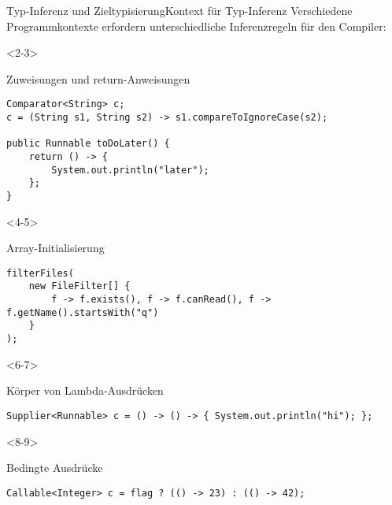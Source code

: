 \begin{frame}[fragile]{Typ-Inferenz und Zieltypisierung}{Kontext für Typ-Inferenz}
    Verschiedene Programmkontexte erfordern unterschiedliche Inferenzregeln für den Compiler:

    \begin{center}
        \begin{minipage}[b]{0.75\textwidth}
            \begin{onlyenv}<2-3>
                \begin{block}{Zuweisungen und return-Anweisungen \citep{goetz13}}
                    \begin{lstlisting}
Comparator<String> c;
c = (String s1, String s2) -> s1.compareToIgnoreCase(s2);

public Runnable toDoLater() {
    return () -> {
        System.out.println("later");
    };
}
                    \end{lstlisting}
                \end{block}
            \end{onlyenv}
            \begin{onlyenv}<4-5>
                \begin{block}{Array-Initialisierung \citep{goetz13}}
                    \begin{lstlisting}
filterFiles(
    new FileFilter[] {
        f -> f.exists(), f -> f.canRead(), f -> f.getName().startsWith("q")
    }
);
                    \end{lstlisting}
                \end{block}
            \end{onlyenv}
            \begin{onlyenv}<6-7>
                \begin{block}{Körper von Lambda-Ausdrücken \citep{goetz13}}
                    \begin{lstlisting}
Supplier<Runnable> c = () -> () -> { System.out.println("hi"); };
                    \end{lstlisting}
                \end{block}
            \end{onlyenv}
            \begin{onlyenv}<8-9>
                \begin{block}{Bedingte Ausdrücke \citep{goetz13}}
                    \begin{lstlisting}
Callable<Integer> c = flag ? (() -> 23) : (() -> 42);
                    \end{lstlisting}

\end{block}
\end{onlyenv}
\end{minipage}
\end{center}
\end{frame}
